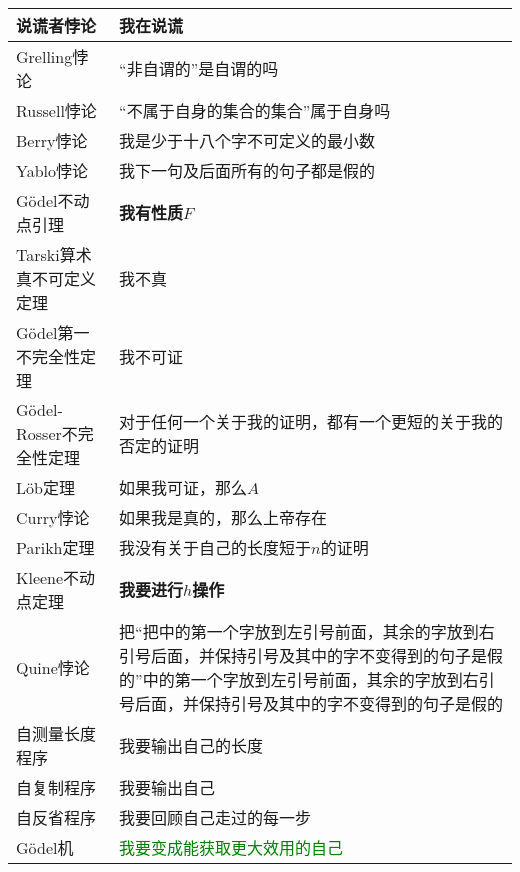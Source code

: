 \documentclass[UTF8,aspectratio=43,11pt,colorlinks,compress,openany]{beamer}%
\begin{document}
\begin{frame}\frametitle{}\footnotesize
\begin{longtabu}{p{0.32\textwidth}|p{0.6\textwidth}}
\hline
说谎者悖论&\textbf{我在说谎}\\
\hline
Grelling悖论&“非自谓的”是自谓的吗\\
\hline
Russell悖论&“不属于自身的集合的集合”属于自身吗\\
\hline
Berry悖论&我是少于十八个字不可定义的最小数\\
\hline
Yablo悖论&我下一句及后面所有的句子都是假的\\
\hline
G\"odel不动点引理&\textbf{我有性质$F$}\\
\hline
Tarski算术真不可定义定理&我不真\\
\hline
G\"odel第一不完全性定理&我不可证\\
\hline
G\"odel-Rosser不完全性定理&对于任何一个关于我的证明，都有一个更短的关于我的否定的证明\\
\hline
L\"ob定理&如果我可证，那么$A$\\
\hline
Curry悖论&如果我是真的，那么上帝存在\\
\hline
Parikh定理&我没有关于自己的长度短于$n$的证明\\
\hline
Kleene不动点定理&\textbf{我要进行$h$操作}\\
\hline
Quine悖论&把“把中的第一个字放到左引号前面，其余的字放到右引号后面，并保持引号及其中的字不变得到的句子是假的”中的第一个字放到左引号前面，其余的字放到右引号后面，并保持引号及其中的字不变得到的句子是假的\\
\hline
自测量长度程序&我要输出自己的长度\\
\hline
自复制程序&我要输出自己\\
\hline
自反省程序&我要回顾自己走过的每一步\\
\hline
G\"odel机&\textcolor{green}{我要变成能获取更大效用的自己}\\
\hline
\end{longtabu}
\end{frame}
\end{document}
